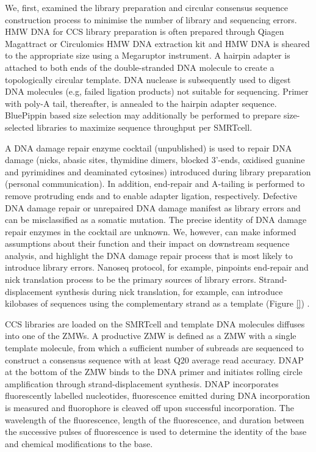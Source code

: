 We, first, examined the library preparation and circular consensus sequence construction process to minimise the number of library and sequencing errors. HMW DNA for CCS library preparation is often prepared through Qiagen Magattract or Circulomics HMW DNA extraction kit and HMW DNA is sheared to the appropriate size using a Megaruptor instrument. A hairpin adapter is attached to both ends of the double-stranded DNA molecule to create a topologically circular template. DNA nuclease is subsequently used to digest DNA molecules (e.g, failed ligation products) not suitable for sequencing. Primer with poly-A tail, thereafter, is annealed to the hairpin adapter sequence. BluePippin based size selection may additionally be performed to prepare size-selected libraries to maximize sequence throughput per SMRTcell. 

A DNA damage repair enzyme cocktail (unpublished) is used to repair DNA damage (nicks, abasic sites, thymidine dimers, blocked 3’-ends, oxidised guanine and pyrimidines and deaminated cytosines) introduced during library preparation (personal communication). In addition, end-repair and A-tailing is performed to remove protruding ends and to enable adapter ligation, respectively. Defective DNA damage repair or unrepaired DNA damage manifest as library errors and can be misclassified as a somatic mutation. The precise identity of DNA damage repair enzymes in the cocktail are unknown. We, however, can make informed assumptions about their function and their impact on downstream sequence analysis, and highlight the DNA damage repair process that is most likely to introduce library errors. Nanoseq protocol, for example, pinpoints end-repair and nick translation process to be the primary sources of library errors. Strand-displacement synthesis during nick translation, for example, can introduce kilobases of sequences using the complementary strand as a template (Figure \ref{}) \cite{}. 

CCS libraries are loaded on the SMRTcell and template DNA molecules diffuses into one of the ZMWs. A productive ZMW is defined as a ZMW with a single template molecule, from which a sufficient number of subreads are sequenced to construct a consensus sequence with at least Q20 average read accuracy. DNAP at the bottom of the ZMW binds to the DNA primer and initiates rolling circle amplification through strand-displacement synthesis. DNAP incorporates fluorescently labelled nucleotides, fluorescence emitted during DNA incorporation is measured and fluorophore is cleaved off upon successful incorporation. The wavelength of the fluorescence, length of the fluorescence, and duration between the successive pulses of fluorescence is used to determine the identity of the base and chemical modifications to the base. 

